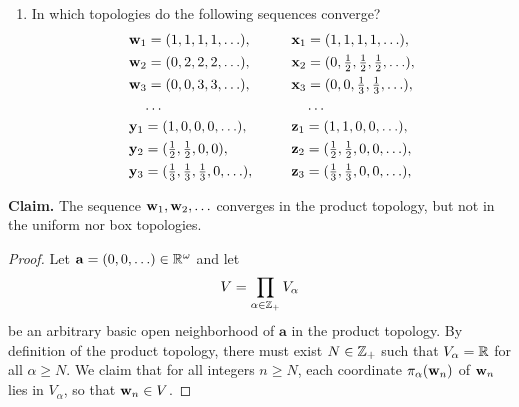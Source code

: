 \begin{solution}
    \begin{enumerate}[label={(\alph*)}, align=left, leftmargin=\parindent, listparindent=\parindent, labelwidth=0pt, itemindent=!]
        \addtocounter{enumi}{1} 
        \item In which topologies do the following sequences converge?
        \begin{alignat*}{2}
            & \mathbf{w}_1 = (1, 1, 1, 1, \ldots),\qquad   & & \mathbf{x}_1 = (1, 1, 1, 1, \ldots), \\
            & \mathbf{w}_2 = (0, 2, 2, 2, \ldots),\qquad   & & \mathbf{x}_2 = (0, \tfrac{1}{2}, \tfrac{1}{2}, \tfrac{1}{2}, \ldots), \\
            & \mathbf{w}_3 = (0, 0, 3, 3, \ldots),\qquad   & & \mathbf{x}_3 = (0, 0, \tfrac{1}{3}, \tfrac{1}{3}, \ldots), \\
            & \quad\ldots                           & & \quad\ldots \\
            & \mathbf{y}_1 = (1, 0, 0, 0, \ldots),\qquad   & & \mathbf{z}_1 = (1, 1, 0, 0, \ldots), \\
            & \mathbf{y}_2 = (\tfrac{1}{2}, \tfrac{1}{2}, 0, 0),                       & & \mathbf{z}_2 = (\tfrac{1}{2}, \tfrac{1}{2}, 0, 0, \ldots), \\
            & \mathbf{y}_3 = (\tfrac{1}{3}, \tfrac{1}{3}, \tfrac{1}{3}, 0, \ldots),    & & \mathbf{z}_3 = (\tfrac{1}{3}, \tfrac{1}{3}, 0, 0, \ldots), \\
        \end{alignat*}
    \end{enumerate}
    \textbf{Claim.} The sequence $\mathbf{w}_1, \mathbf{w}_2, \ldots$ converges in the product topology, but not in the uniform nor box topologies.
    \begin{proof}
        Let $\mathbf{a} = (0, 0, \ldots) \in \mathbb{R}^\omega$ and let
        \begin{equation*}
            V = \prod_{\alpha \in \mathbb{Z}_+} V_\alpha
        \end{equation*}
        be an arbitrary basic open neighborhood of $\mathbf{a}$ in the product topology.
        By definition of the product topology, there must exist $N \in \mathbb{Z}_+$ such that $V_\alpha = \mathbb{R}$ for all $\alpha \geq N$.
        We claim that for all integers $n \geq N$, each coordinate $\pi_\alpha(\mathbf{w}_n)$ of $\mathbf{w}_n$ lies in $V_\alpha$, so that $\mathbf{w}_n \in V$.


\end{proof}
\end{solution}
